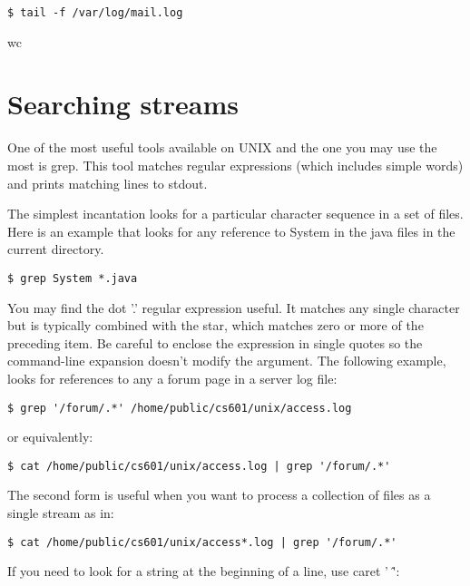 \begin{fullwidth}
\begin{lstlisting}[style=BashInputStyle]
$ tail -f /var/log/mail.log
\end{lstlisting}

wc

\section{Searching streams}

One of the most useful tools available on UNIX and the one you may use the most is grep. This tool matches regular expressions (which includes simple words) and prints matching lines to stdout.

The simplest incantation looks for a particular character sequence in a set of files. Here is an example that looks for any reference to System in the java files in the current directory.

\begin{lstlisting}[style=BashInputStyle]
$ grep System *.java
\end{lstlisting}

You may find the dot '.' regular expression useful. It matches any single character but is typically combined with the star, which matches zero or more of the preceding item. Be careful to enclose the expression in single quotes so the command-line expansion doesn't modify the argument. The following example, looks for references to any a forum page in a server log file:

\begin{lstlisting}[style=BashInputStyle]
$ grep '/forum/.*' /home/public/cs601/unix/access.log
\end{lstlisting}

\noindent or equivalently:

\begin{lstlisting}[style=BashInputStyle]
$ cat /home/public/cs601/unix/access.log | grep '/forum/.*' 
\end{lstlisting}

\noindent The second form is useful when you want to process a collection of files as a single stream as in:

\begin{lstlisting}[style=BashInputStyle]
$ cat /home/public/cs601/unix/access*.log | grep '/forum/.*'
\end{lstlisting}

\noindent If you need to look for a string at the beginning of a line, use caret ' \^':


\end{fullwidth}
